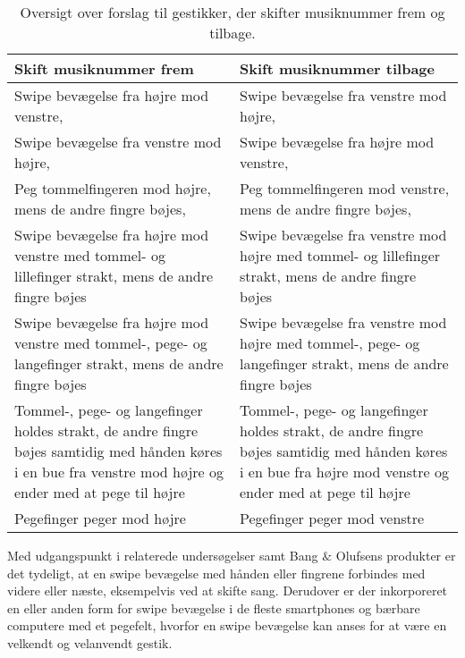 \begin{table}[H]
	\centering
	\begin{tabular}{| p{6cm} | p{6cm} |}
		\hline
		\textbf{Skift musiknummer frem} & \textbf{Skift musiknummer tilbage} \\ \hline
		Swipe bevægelse fra højre mod venstre, \parencite[s. 48]{WEB:Beosound2, WEB:BeosoundMoment, PDF:UserDefinedGesturesTV} & Swipe bevægelse fra venstre mod højre, \parencite[s. 48]{WEB:Beosound2, WEB:BeosoundMoment, PDF:UserDefinedGesturesTV} \\ \hline
		Swipe bevægelse fra venstre mod højre, \parencite[s. 166]{PDF:ComparingInputModalities}  & Swipe bevægelse fra højre mod venstre, \parencite[s. 166]{PDF:ComparingInputModalities}  \\ \hline
		Peg tommelfingeren mod højre, mens de andre fingre bøjes, \parencite[s. 166]{PDF:ComparingInputModalities} & Peg tommelfingeren mod venstre, mens de andre fingre bøjes, \parencite[s. 166]{PDF:ComparingInputModalities} \\ \hline
		Swipe bevægelse fra højre mod venstre med tommel- og lillefinger strakt, mens de andre fingre bøjes & Swipe bevægelse fra venstre mod højre med tommel- og lillefinger strakt, mens de andre fingre bøjes \\ \hline
		Swipe bevægelse fra højre mod venstre med tommel-, pege- og langefinger strakt, mens de andre fingre bøjes & Swipe bevægelse fra venstre mod højre med tommel-, pege- og langefinger strakt, mens de andre fingre bøjes \\ \hline
		Tommel-, pege- og langefinger holdes strakt, de andre fingre bøjes samtidig med hånden køres i en bue fra venstre mod højre og ender med at pege til højre & Tommel-, pege- og langefinger holdes strakt, de andre fingre bøjes samtidig med hånden køres i en bue fra højre mod venstre og ender med at pege til højre\\ \hline
		Pegefinger peger mod højre & Pegefinger peger mod venstre\\ \hline
	\end{tabular}
	\caption{Oversigt over forslag til gestikker, der skifter musiknummer frem og tilbage.}
	\label{tab:IndsamledeGestikkerSkift}
\end{table}
\noindent
%
Med udgangspunkt i relaterede undersøgelser samt Bang $\&$ Olufsens produkter er det tydeligt, at en swipe bevægelse med hånden eller fingrene forbindes med videre eller næste, eksempelvis ved at skifte sang. Derudover er der inkorporeret en eller anden form for swipe bevægelse i de fleste smartphones og bærbare computere med et pegefelt, hvorfor en swipe bevægelse kan anses for at være en velkendt og velanvendt gestik.

